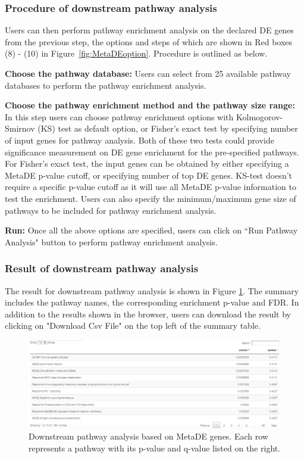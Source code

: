 \subsubsection{Procedure of downstream pathway analysis}
Users can then perform pathway enrichment analysis on the declared DE genes from the previous step, 
the options and steps of which are shown in {\color{red} Red boxes (8) - (10)} in Figure~\ref{fig:MetaDEoption}.
Procedure is outlined as below.

\begin{steps}
\item \textbf{Choose the pathway database:}
Users can select from 25 available pathway databases to perform the pathway enrichment analysis. 

\item \textbf{Choose the pathway enrichment method and the pathway size range:}
In this step users can choose pathway enrichment options with Kolmogorov-Smirnov (KS) test as default option,
or Fisher's exact test by specifying number of input genes for pathway analysis.
Both of these two tests could provide significance measurement on DE gene enrichment for the pre-specified pathways.
For Fisher's exact test, the input genes can be obtained by either specifying a MetaDE p-value cutoff, or specifying number of top DE genes.
KS-test doesn't require a specific p-value cutoff as it will use all MetaDE p-value information to test the enrichment.
Users can also specify the minimum/maximum gene size of pathways to be included for pathway enrichment analysis.

\item \textbf{Run:}
Once all the above options are specified, users can click on ``Run Pathway Analysis" button to perform pathway enrichment analysis.

\end{steps}


\subsubsection{Result of downstream pathway analysis}

The result for downstream pathway analysis is shown in Figure \ref{fig:MetaDEresult2}. 
The summary includes the pathway names, the corresponding enrichment p-value and FDR. 
In addition to the results shown in the browser, 
users can download the result by clicking on "Download Csv File" on the top left of the summary table. 

\begin{figure}[H]
\begin{center}
\includegraphics[scale=0.5]{./figure/metaDE/MetaDE_pathway.pdf}
\caption{Downstream pathway analysis based on MetaDE genes.
Each row represents a pathway with its p-value and q-value listed on the right.
}
\label{fig:MetaDEresult2}
\end{center}
\end{figure}



